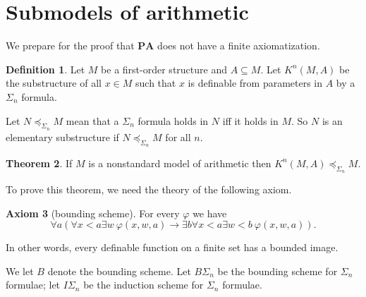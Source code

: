 \documentclass[12pt]{report}
\newcommand{\PA}{\mathbf{PA}}
\theoremstyle{definition}
\newtheorem{theorem}{Theorem}[chapter]
\newtheorem{axiom}[theorem]{Axiom}
\newtheorem{definition}[theorem]{Definition}
\begin{document}
\section{Submodels of arithmetic}
We prepare for the proof that $\PA$ does not have a finite axiomatization.
\begin{definition}
Let $M$ be a first-order structure and $A \subseteq M$.
Let $K^n(M, A)$ be the substructure of all $x \in M$ such that $x$ is definable from parameters in $A$ by a $\Sigma_n$ formula.
\end{definition}

Let $N \preceq_{\Sigma_n} M$ mean that a $\Sigma_n$ formula holds in $N$ iff it holds in $M$.
So $N$ is an elementary substructure if $N \preceq_{\Sigma_n} M$ for all $n$.
\begin{theorem}
\label{Sigma_n elementary substructure}
If $M$ is a nonstandard model of arithmetic then $K^n(M, A) \preceq_{\Sigma_n} M$.
\end{theorem}
To prove this theorem, we need the theory of the following axiom.
\begin{axiom}[bounding scheme]
For every $\varphi$ we have
$$\forall a(\forall x < a \exists w ~\varphi(x, w, a) \to \exists b\forall x < a\exists w<b~\varphi(x, w, a)).$$
\end{axiom}
In other words, every definable function on a finite set has a bounded image.

We let $B$ denote the bounding scheme. Let $B\Sigma_n$ be the bounding scheme for $\Sigma_n$ formulae; let $I\Sigma_n$ be the induction scheme for $\Sigma_n$ formulae.
\end{document}
